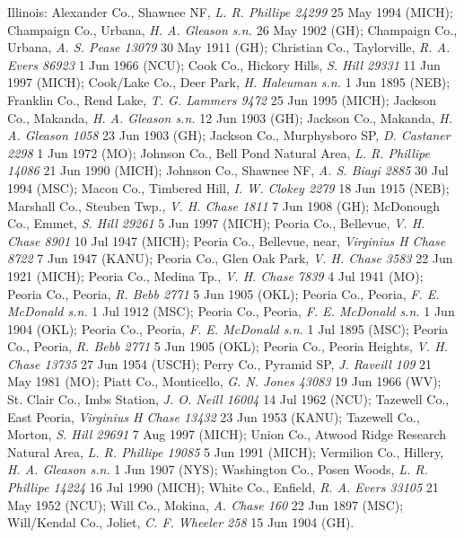 \documentclass{article}
\begin{document}
Illinois:
Alexander Co., Shawnee NF, \textit{L. R. Phillipe 24299} 25 May 1994 (MICH);
Champaign Co., Urbana, \textit{H. A. Gleason s.n.} 26 May 1902 (GH);
Champaign Co., Urbana, \textit{A. S. Pease 13079} 30 May 1911 (GH);
Christian Co., Taylorville, \textit{R. A. Evers 86923} 1 Jun 1966 (NCU);
Cook Co., Hickory Hills, \textit{S. Hill 29331} 11 Jun 1997 (MICH);
Cook/Lake Co., Deer Park, \textit{H. Haleuman s.n.} 1 Jun 1895 (NEB);
Franklin Co., Rend Lake, \textit{T. G. Lammers 9472} 25 Jun 1995 (MICH);
Jackson Co., Makanda, \textit{H. A. Gleason s.n.} 12 Jun 1903 (GH);
Jackson Co., Makanda, \textit{H. A. Gleason 1058} 23 Jun 1903 (GH);
Jackson Co., Murphysboro SP, \textit{D. Castaner 2298} 1 Jun 1972 (MO);
Johnson Co., Bell Pond Natural Area, \textit{L. R. Phillipe 14086} 21 Jun 1990 (MICH);
Johnson Co., Shawnee NF, \textit{A. S. Biagi 2885} 30 Jul 1994 (MSC);
Macon Co., Timbered Hill, \textit{I. W. Clokey 2279} 18 Jun 1915 (NEB);
Marshall Co., Steuben Twp., \textit{V. H. Chase 1811} 7 Jun 1908 (GH);
McDonough Co., Emmet, \textit{S. Hill 29261} 5 Jun 1997 (MICH);
Peoria Co., Bellevue, \textit{V. H. Chase 8901} 10 Jul 1947 (MICH);
Peoria Co., Bellevue, near, \textit{Virginius H Chase 8722} 7 Jun 1947 (KANU);
Peoria Co., Glen Oak Park, \textit{V. H. Chase 3583} 22 Jun 1921 (MICH);
Peoria Co., Medina Tp., \textit{V. H. Chase 7839} 4 Jul 1941 (MO);
Peoria Co., Peoria, \textit{R. Bebb 2771} 5 Jun 1905 (OKL);
Peoria Co., Peoria, \textit{F. E. McDonald s.n.} 1 Jul 1912 (MSC);
Peoria Co., Peoria, \textit{F. E. McDonald s.n.} 1 Jun 1904 (OKL);
Peoria Co., Peoria, \textit{F. E. McDonald s.n.} 1 Jul 1895 (MSC);
Peoria Co., Peoria, \textit{R. Bebb 2771} 5 Jun 1905 (OKL);
Peoria Co., Peoria Heights, \textit{V. H. Chase 13735} 27 Jun 1954 (USCH);
Perry Co., Pyramid SP, \textit{J. Raveill 109} 21 May 1981 (MO);
Piatt Co., Monticello, \textit{G. N. Jones 43083} 19 Jun 1966 (WV);
St. Clair Co., Imbs Station, \textit{J. O. Neill 16004} 14 Jul 1962 (NCU);
Tazewell Co., East Peoria, \textit{Virginius H Chase 13432} 23 Jun 1953 (KANU);
Tazewell Co., Morton, \textit{S. Hill 29691} 7 Aug 1997 (MICH);
Union Co., Atwood Ridge Research Natural Area, \textit{L. R. Phillipe 19085} 5 Jun 1991 (MICH);
Vermilion Co., Hillery, \textit{H. A. Gleason s.n.} 1 Jun 1907 (NYS);
Washington Co., Posen Woods, \textit{L. R. Phillipe 14224} 16 Jul 1990 (MICH);
White Co., Enfield, \textit{R. A. Evers 33105} 21 May 1952 (NCU);
Will Co., Mokina, \textit{A. Chase 160} 22 Jun 1897 (MSC);
Will/Kendal Co., Joliet, \textit{C. F. Wheeler 258} 15 Jun 1904 (GH).
\end{document}
